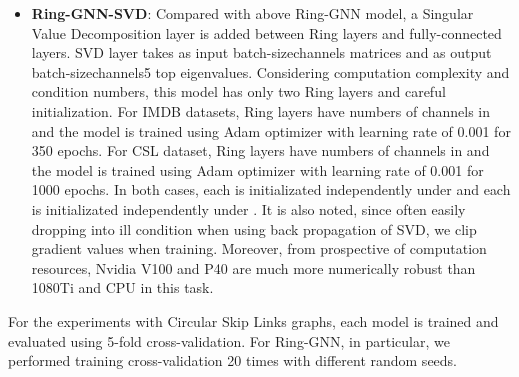 \documentclass{article}
\begin{document}
\begin{itemize}
\item \textbf{Ring-GNN-SVD}: Compared with above Ring-GNN model, a Singular Value Decomposition layer is added between Ring layers and fully-connected layers. SVD layer takes as input batch-sizechannels matrices and as output batch-sizechannels5 top eigenvalues. Considering computation complexity and condition numbers, this model has only two Ring layers and careful initialization. 
For IMDB datasets, Ring layers have numbers of channels in  and the model is trained using Adam optimizer with learning rate of 0.001 for 350 epochs. For CSL dataset, Ring layers have numbers of channels in  and the model is trained using Adam optimizer with learning rate of 0.001 for 1000 epochs. In both cases, each  is initializated independently under  and each  is initializated independently under . It is also noted, since often easily dropping into ill condition when using back propagation of SVD, we clip gradient values when training. Moreover, from prospective of computation resources, Nvidia V100 and P40 are much more numerically robust than 1080Ti and CPU in this task.


\end{itemize}

For the experiments with Circular Skip Links graphs, each model is trained and evaluated using 5-fold cross-validation. For Ring-GNN, in particular, we performed training  cross-validation 20 times with different random seeds.
\end{document}
